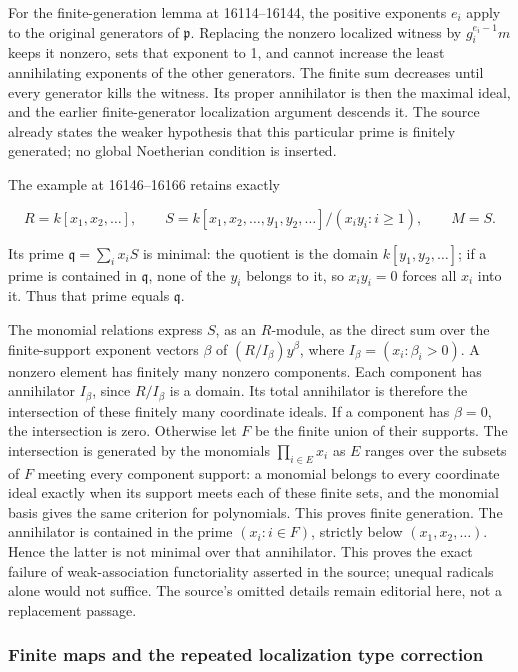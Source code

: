 For the finite-generation lemma at 16114--16144, the positive exponents \(e_i\) apply to the original generators of \(\mathfrak p\). Replacing the nonzero localized witness by \(g_i^{e_i-1}m\) keeps it nonzero, sets that exponent to 1, and cannot increase the least annihilating exponents of the other generators. The finite sum decreases until every generator kills the witness. Its proper annihilator is then the maximal ideal, and the earlier finite-generator localization argument descends it. The source already states the weaker hypothesis that this particular prime is finitely generated; no global Noetherian condition is inserted.

The example at 16146--16166 retains exactly

\[
R=k[x_1,x_2,\ldots],\qquad
S=k[x_1,x_2,\ldots,y_1,y_2,\ldots]/(x_iy_i:i\geq1),\qquad M=S.
\]

Its prime \(\mathfrak q=\sum_i x_iS\) is minimal: the quotient is the domain \(k[y_1,y_2,\ldots]\); if a prime is contained in \(\mathfrak q\), none of the \(y_i\) belongs to it, so \(x_iy_i=0\) forces all \(x_i\) into it. Thus that prime equals \(\mathfrak q\).

The monomial relations express \(S\), as an \(R\)-module, as the direct sum over the finite-support exponent vectors \(\beta\) of \((R/I_\beta)y^\beta\), where \(I_\beta=(x_i:\beta_i>0)\). A nonzero element has finitely many nonzero components. Each component has annihilator \(I_\beta\), since \(R/I_\beta\) is a domain. Its total annihilator is therefore the intersection of these finitely many coordinate ideals. If a component has \(\beta=0\), the intersection is zero. Otherwise let \(F\) be the finite union of their supports. The intersection is generated by the monomials \(\prod_{i\in E}x_i\) as \(E\) ranges over the subsets of \(F\) meeting every component support: a monomial belongs to every coordinate ideal exactly when its support meets each of these finite sets, and the monomial basis gives the same criterion for polynomials. This proves finite generation. The annihilator is contained in the prime \((x_i:i\in F)\), strictly below \((x_1,x_2,\ldots)\). Hence the latter is not minimal over that annihilator. This proves the exact failure of weak-association functoriality asserted in the source; unequal radicals alone would not suffice. The source's omitted details remain editorial here, not a replacement passage.

\subsubsection{Finite maps and the repeated localization type correction}\label{algebra-proof-005-finite-maps-and-the-repeated-localization-type-correction}

